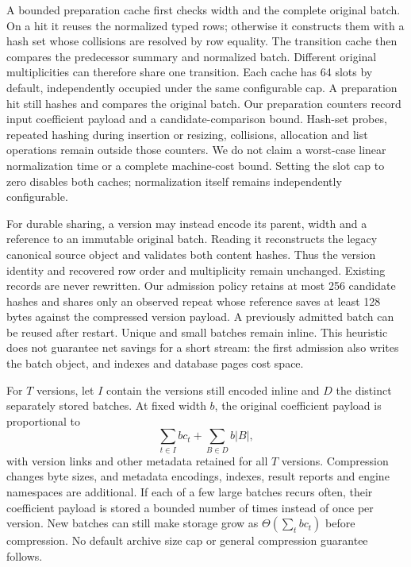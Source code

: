 \documentclass[11pt,a4paper]{article}
\numberwithin{equation}{section}
\theoremstyle{plain}
\theoremstyle{definition}
\theoremstyle{remark}
\begin{document}
A bounded preparation cache first checks width and the complete original batch. On a hit it reuses the normalized typed rows; otherwise it constructs them with a hash set whose collisions are resolved by row equality. The transition cache then compares the predecessor summary and normalized batch. Different original multiplicities can therefore share one transition. Each cache has 64 slots by default, independently occupied under the same configurable cap. A preparation hit still hashes and compares the original batch. Our preparation counters record input coefficient payload and a candidate-comparison bound. Hash-set probes, repeated hashing during insertion or resizing, collisions, allocation and list operations remain outside those counters. We do not claim a worst-case linear normalization time or a complete machine-cost bound. Setting the slot cap to zero disables both caches; normalization itself remains independently configurable.

For durable sharing, a version may instead encode its parent, width and a reference to an immutable original batch. Reading it reconstructs the legacy canonical source object and validates both content hashes. Thus the version identity and recovered row order and multiplicity remain unchanged. Existing records are never rewritten. Our admission policy retains at most 256 candidate hashes and shares only an observed repeat whose reference saves at least 128 bytes against the compressed version payload. A previously admitted batch can be reused after restart. Unique and small batches remain inline. This heuristic does not guarantee net savings for a short stream: the first admission also writes the batch object, and indexes and database pages cost space.

For $T$ versions, let $I$ contain the versions still encoded inline and $D$ the distinct separately stored batches. At fixed width $b$, the original coefficient payload is proportional to
\[
\sum_{t\in I} b c_t + \sum_{B\in D} b|B|,
\]
with version links and other metadata retained for all $T$ versions. Compression changes byte sizes, and metadata encodings, indexes, result reports and engine namespaces are additional. If each of a few large batches recurs often, their coefficient payload is stored a bounded number of times instead of once per version. New batches can still make storage grow as $\Theta(\sum_t b c_t)$ before compression. No default archive size cap or general compression guarantee follows.
\end{document}
